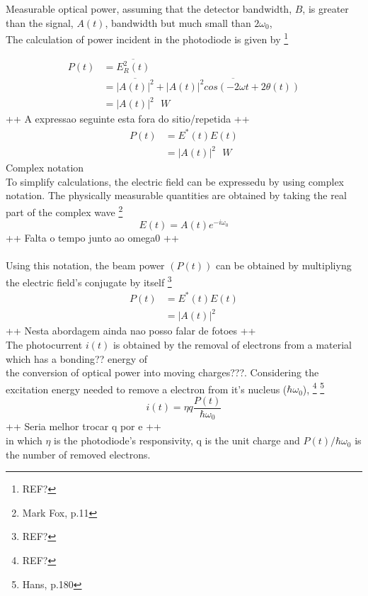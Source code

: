 Measurable optical power, assuming that the detector bandwidth, $B$, is greater than the signal, $A(t)$, bandwidth but much small than $2 \omega_0$, %
\\
The calculation of power incident in the photodiode is given by
\footnote{REF?}\

\begin{align}
	P(t) &= \overline{E_R^2(t)}\nonumber\\
         &= \overline{|A(t)|^2} + \overline{ |A(t)|^2 cos\left(-2 \omega t + 2\theta(t)\right)}\nonumber\\
         &= |A(t)|^2 \,\,\,\, W
\end{align}
++ A expressao seguinte esta fora do sitio/repetida ++
\begin{align}
	P(t) &= E^{*}(t) E(t)\nonumber\\
         &= |A(t)|^2 \,\,\,\, W
\end{align}
Complex notation
\\
To simplify calculations, the electric field can be expressedu by using complex notation. The physically measurable quantities are obtained by taking the real part of the complex wave
\footnote{Mark Fox, p.11}
\begin{equation}
	E(t) = A(t) e^{-i \omega_0}
\end{equation}
++ Falta o tempo junto ao omega0 ++\\
\\
Using this notation, the beam power $(P(t))$ can be obtained by multipliyng the electric field's conjugate by itself
\footnote{REF?}
\begin{align}
	P(t) &= E^{*}(t) E(t)\nonumber\\
         &= |A(t)|^2
\end{align}
++ Nesta abordagem ainda nao posso falar de fotoes ++\\
The photocurrent $i(t)$ is obtained by the removal of electrons from a material which has a bonding?? energy of 
\\
the conversion of optical power into moving charges???. Considering the excitation energy needed to remove a electron from it's nucleus ($\hbar \omega_0$),
\footnote{REF?}
\footnote{Hans, p.180}
\begin{equation}
	i(t) = \eta q \frac{P(t)}{\hbar \omega_0}
\end{equation}
++ Seria melhor trocar q por e ++\\
in which $\eta$ is the photodiode's responsivity, q is the unit charge and $P(t)/\hbar \omega_0$ is the number of removed electrons.\\
